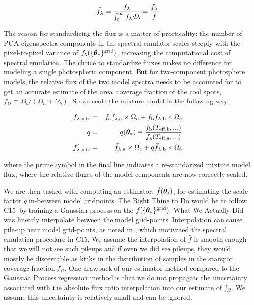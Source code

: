\documentclass[twocolumn]{emulateapj}%
\newcommand{\iancze}{{\sc C15}}
\begin{document}
\begin{eqnarray} \label{eqn:normalization}
\bar {f_\lambda} = \frac{f_\lambda}{\int_{0}^{\infty} f_\lambda d\lambda} = \frac{f_\lambda}{f}
\end{eqnarray}

The reason for standardizing the flux is a matter of practicality: the number of PCA eigenspectra components in the spectral emulator scales steeply with the pixel-to-pixel variance of $f_{\lambda}(\{{\bm \theta}_{\ast}\}^\textrm{grid})$, increasing the computational cost of spectral emulation.  The choice to standardize fluxes makes no difference for modeling a single photospheric component.  But for two-component photosphere models, the relative flux of the two model spectra needs to be accounted for to get an accurate estimate of the areal coverage fraction of the cool spots, $f_{\Omega} \equiv \Omega_b/(\Omega_a+\Omega_b)$.  So we scale the mixture model in the following way:

\begin{eqnarray} \label{eqn:norm_scaling}
f_{\lambda, \mathrm{mix}} &=& f_{\mathrm{a}} \bar f_{\lambda, \mathrm{a}} \times \Omega_a + f_{\mathrm{b}} \bar f_{\lambda, \mathrm{b}} \times \Omega_b \\
q &=& q({\bm \theta}_{\ast})\equiv \frac{f_{\mathrm{b}}(T_\textrm{eff,b}, ...)}{f_{\mathrm{a}}(T_\textrm{eff,a}, ...)} \\
f_{\lambda, \mathrm{mix}}^{\prime} &=& \bar f_{\lambda, \mathrm{a}} \times \Omega_a + q \bar f_{\lambda, \mathrm{b}} \times \Omega_b
\end{eqnarray}

where the prime symbol in the final line indicates a re-standarized mixture model flux, where the relative fluxes of the model components are now correctly scaled.

We are then tasked with computing an estimator, $\hat f({\bm \theta}_{\ast})$, for estimating the scale factor $q$ in-between model gridpoints.  The Right Thing to Do would be to follow \iancze\ by training a Gaussian process on the $f(\{{\bm \theta}_{\ast}\}^\textrm{grid})$.  What We Actually Did was linearly interpolate between the model grid-points.  Interpolation can cause pile-up near model grid-points, as noted in \citet{cottaar14}, which motivated the spectral emulation procedure in \iancze.  We assume the interpolation of $\hat f$ is smooth enough that we will not see such pileups and if even we did see pileups, they would mostly be discernable as kinks in the distribution of samples in the starspot coverage fraction $f_{\Omega}$.  One drawback of our estimator method compared to the Gaussian Process regression method is that we do not propagate the uncertainty associated with the absolute flux ratio interpolation into our estimate of $f_{\Omega}$.  We assume this uncertainty is relatively small and can be ignored.
\end{document}
